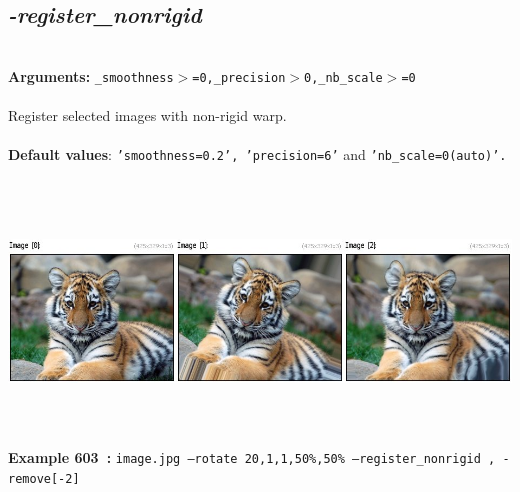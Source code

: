 \documentclass[a4paper,11pt,twoside]{book}
\begin{document}
\subsection{\emph{-register\_nonrigid} }\vspace*{-0.5em}
~\\\textbf{Arguments: } 
{\small \texttt{\_smoothness$>$=0,\_precision$>$0,\_nb\_scale$>$=0}}\\~\\
Register selected images with non-rigid warp.
~\\~\\\textbf{Default values}: {\small \texttt{'smoothness=0.2', 'precision=6'} and \texttt{'nb\_scale=0(auto)'.}}
\begin{center}\includegraphics[keepaspectratio=true,height=7cm,width=\textwidth]{img/gmic_def603.jpg}\\
{\footnotesize \textbf{Example 603~:} \texttt{image.jpg --rotate 20,1,1,50\%,50\% --register\_nonrigid , -remove[-2]}}
\end{center}
\end{document}
